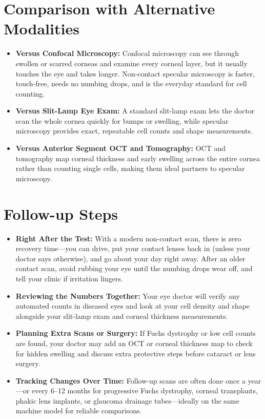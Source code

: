 \section{Comparison with Alternative Modalities}

\begin{itemize}
    \item \textbf{Versus Confocal Microscopy:} Confocal microscopy can see through swollen or scarred corneas and examine every corneal layer, but it usually touches the eye and takes longer. Non-contact specular microscopy is faster, touch-free, needs no numbing drops, and is the everyday standard for cell counting.
    \item \textbf{Versus Slit-Lamp Eye Exam:} A standard slit-lamp exam lets the doctor scan the whole cornea quickly for bumps or swelling, while specular microscopy provides exact, repeatable cell counts and shape measurements.
    \item \textbf{Versus Anterior Segment OCT and Tomography:} OCT and tomography map corneal thickness and early swelling across the entire cornea rather than counting single cells, making them ideal partners to specular microscopy.
\end{itemize}

\section{Follow-up Steps}

\begin{itemize}
    \item \textbf{Right After the Test:} With a modern non-contact scan, there is zero recovery time---you can drive, put your contact lenses back in (unless your doctor says otherwise), and go about your day right away. After an older contact scan, avoid rubbing your eye until the numbing drops wear off, and tell your clinic if irritation lingers.
    \item \textbf{Reviewing the Numbers Together:} Your eye doctor will verify any automated counts in diseased eyes and look at your cell density and shape alongside your slit-lamp exam and corneal thickness measurements.
    \item \textbf{Planning Extra Scans or Surgery:} If Fuchs dystrophy or low cell counts are found, your doctor may add an OCT or corneal thickness map to check for hidden swelling and discuss extra protective steps before cataract or lens surgery.
    \item \textbf{Tracking Changes Over Time:} Follow-up scans are often done once a year---or every 6--12 months for progressive Fuchs dystrophy, corneal transplants, phakic lens implants, or glaucoma drainage tubes---ideally on the same machine model for reliable comparisons.
\end{itemize}

